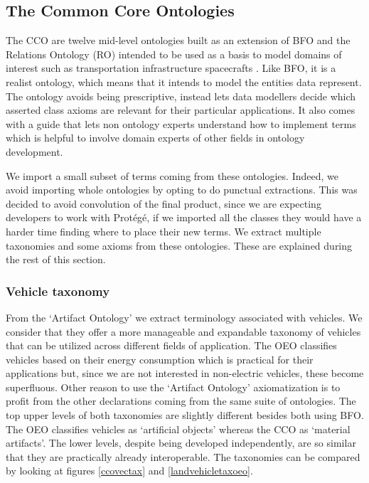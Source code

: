 \subsection{The Common Core Ontologies}

The CCO are twelve mid-level ontologies built as an extension of BFO and the
Relations Ontology (RO) intended to be used as a basis to model domains of
interest such as transportation infrastructure spacecrafts
\cite{Rudnicki.23September2020}. Like BFO, it is a realist ontology, which
means that it intends to model the entities data represent. The ontology
avoids being prescriptive, instead lets data modellers decide which asserted
class axioms are relevant for their particular applications. It also comes with
a guide that lets non ontology experts understand how to implement terms which
is helpful to involve domain experts of other fields in ontology development.

We import a small subset of terms coming from these ontologies. Indeed, we
avoid importing whole ontologies by opting to do punctual extractions. This was
decided to avoid convolution of the final product, since we are expecting
developers to work with Protégé, if we imported all the classes they would have
a harder time finding where to place their new terms. We extract multiple
taxonomies and some axioms from these ontologies. These are explained during the
rest of this section.

\subsubsection{Vehicle taxonomy}

From the `Artifact Ontology' we extract terminology associated with vehicles.
We consider that they offer a more manageable and expandable taxonomy of
vehicles that can be utilized across different fields of application. The OEO
classifies vehicles based on their energy consumption which is practical for
their applications but, since we are not interested in non-electric vehicles,
these become superfluous. Other reason to use the `Artifact Ontology'
axiomatization is to profit from the other declarations coming from the same
suite of ontologies. The top upper levels of both taxonomies are slightly
different besides both using BFO. The OEO classifies vehicles as `artificial
objects' whereas the CCO as `material artifacts'. The lower levels, despite
being developed independently, are so similar  that they are practically
already interoperable. The taxonomies can be compared by looking at figures
\ref{ccovectax} and \ref{landvehicletaxoeo}.

